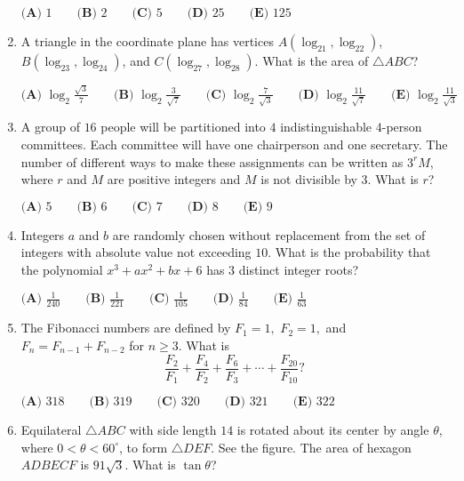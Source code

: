 \documentclass{article}
\begin{document}
\begin{enumerate}[label=\arabic*., itemsep=0.5em]
\(\textbf{(A) }1 \qquad\textbf{(B) }2 \qquad\textbf{(C) }5 \qquad\textbf{(D) }25 \qquad\textbf{(E) }125 \qquad\)\par \vspace{0.5em}\item A triangle in the coordinate plane has vertices \(A(\log_21,\log_22)\), \(B(\log_23,\log_24)\), and \(C(\log_27,\log_28)\). What is the area of \(\triangle ABC\)?

\(
\textbf{(A) }\log_2\frac{\sqrt3}7\qquad
\textbf{(B) }\log_2\frac3{\sqrt7}\qquad
\textbf{(C) }\log_2\frac7{\sqrt3}\qquad
\textbf{(D) }\log_2\frac{11}{\sqrt7}\qquad
\textbf{(E) }\log_2\frac{11}{\sqrt3}\qquad
\)\par \vspace{0.5em}\item A group of \(16\) people will be partitioned into \(4\) indistinguishable \(4\)-person committees. Each committee will have one chairperson and one secretary. The number of different ways to make these assignments can be written as \(3^{r}M\), where \(r\) and \(M\) are positive integers and \(M\) is not divisible by \(3\). What is \(r\)?

\(
\textbf{(A) }5 \qquad
\textbf{(B) }6 \qquad
\textbf{(C) }7 \qquad
\textbf{(D) }8 \qquad
\textbf{(E) }9 \qquad\)\par \vspace{0.5em}\item Integers \(a\) and \(b\) are randomly chosen without replacement from the set of integers with absolute value not exceeding \(10\). What is the probability that the polynomial \(x^3 + ax^2 + bx + 6\) has \(3\) distinct integer roots?

\(\textbf{(A) }\frac{1}{240} \qquad \textbf{(B) }\frac{1}{221} \qquad \textbf{(C) }\frac{1}{105} \qquad \textbf{(D) }\frac{1}{84} \qquad \textbf{(E) }\frac{1}{63}\)\par \vspace{0.5em}\item The Fibonacci numbers are defined by \(F_1=1,\) \(F_2=1,\) and \(F_n=F_{n-1}+F_{n-2}\) for \(n\geq 3.\) What is
\begin{equation*}
\dfrac{F_2}{F_1}+\dfrac{F_4}{F_2}+\dfrac{F_6}{F_3}+\cdots+\dfrac{F_{20}}{F_{10}}?
\end{equation*}

\(\textbf{(A) }318 \qquad\textbf{(B) }319\qquad\textbf{(C) }320\qquad\textbf{(D) }321\qquad\textbf{(E) }322\)\par \vspace{0.5em}\item Equilateral \(\triangle ABC\) with side length \(14\) is rotated about its center by angle \(\theta\), where \(0 < \theta < 60^{\circ}\), to form \(\triangle DEF\). See the figure. The area of hexagon \(ADBECF\) is \(91\sqrt{3}\). What is \(\tan\theta\)?


\end{enumerate}
\end{document}
